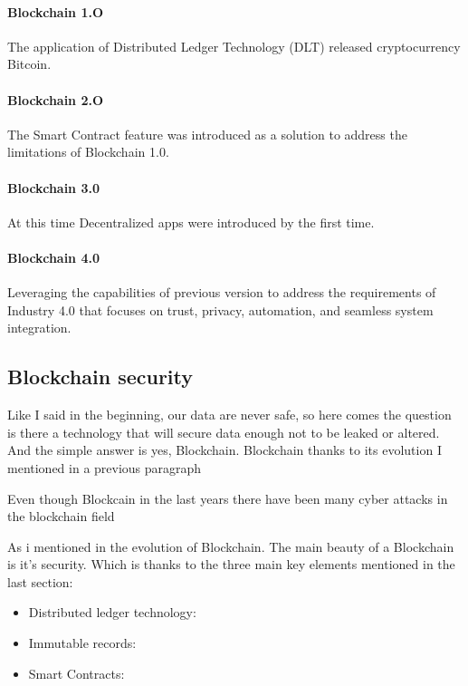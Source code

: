 \documentclass[10pt,english,a4paper]{article}
\begin{document}
\paragraph{Blockchain 1.O}
The application of Distributed Ledger Technology (DLT) released cryptocurrency Bitcoin.
\cite{Suroso:SKCK}
\paragraph{Blockchain 2.O}
The Smart Contract feature was introduced as a solution to address the limitations of Blockchain 1.0.
\cite{Suroso:SKCK}
\paragraph{Blockchain 3.0}
At this time Decentralized apps were introduced by the first time. 
\cite{Suroso:SKCK}
\paragraph{Blockchain 4.0}
Leveraging the capabilities of previous version to address the requirements of Industry 4.0 that focuses on trust, privacy, automation, and seamless system integration.
\cite{Suroso:SKCK}

\subsection{Blockchain security}
Like I said in the beginning, our data are never safe, so here comes the question is there a technology that will secure data enough not to be leaked or altered. And the simple answer is yes, Blockchain. Blockchain thanks to its evolution I mentioned in a previous paragraph 

Even though Blockcain in the last years there have been many cyber attacks in the blockchain field
\cite{Xiaofen:Blockchain-security}

As i mentioned in the evolution of Blockchain. The main beauty of a Blockchain is it's security. Which is thanks to the three main key elements mentioned in the last section:

\begin{itemize}
    \item Distributed ledger technology:
    \item Immutable records:
    \item Smart Contracts:
\end{itemize}
   
  
\end{document}
